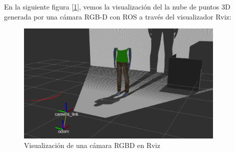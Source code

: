 En la siguiente figura [\ref{fig:camara_rviz}], vemos la visualización del la nube de puntos 3D generada por una cámara RGB-D con ROS a través del visualizador Rviz:\\

\begin{figure} [H]
  \begin{center}
    \includegraphics[width=10cm]{imagenes/cap3/camara-rviz.png}
  \end{center}
  \caption[Visualización de una cámara RGBD en Rviz]{Visualización de una cámara RGBD en Rviz}
  \label{fig:camara_rviz}
\end{figure}\


